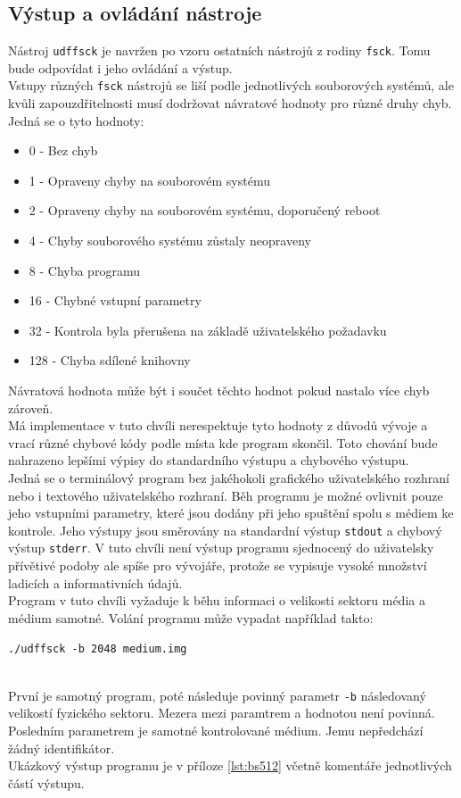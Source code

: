 \subsection{Výstup a ovládání nástroje}
Nástroj \texttt{udffsck} je navržen po vzoru ostatních nástrojů z rodiny \texttt{fsck}. Tomu bude odpovídat i jeho ovládání a výstup.\\
Vstupy různých \texttt{fsck} nástrojů se liší podle jednotlivých souborových systémů, ale kvůli zapouzdřitelnosti musí dodržovat návratové hodnoty pro různé druhy chyb. Jedná se o tyto hodnoty:
\begin{itemize}
    \item 0 - Bez chyb 
    \item 1 - Opraveny chyby na souborovém systému
    \item 2 - Opraveny chyby na souborovém systému, doporučený reboot 
    \item 4 - Chyby souborového systému zůstaly neopraveny
    \item 8 - Chyba programu
    \item 16 - Chybné vstupní parametry
    \item 32 - Kontrola byla přerušena na základě uživatelského požadavku
    \item 128 - Chyba sdílené knihovny
\end{itemize}
Návratová hodnota může být i součet těchto hodnot pokud nastalo více chyb zároveň.\\
Má implementace v tuto chvíli nerespektuje tyto hodnoty z důvodů vývoje a vrací různé chybové kódy podle místa kde program skončil. Toto chování bude nahrazeno lepšími výpisy do standardního výstupu a chybového výstupu.\\
Jedná se o terminálový program bez jakéhokoli grafického uživatelského rozhraní nebo i textového uživatelského rozhraní. Běh programu je možné ovlivnit pouze jeho vstupními parametry, které jsou dodány při jeho spuštění spolu s médiem ke kontrole. Jeho výstupy jsou směrovány na standardní výstup \texttt{stdout} a chybový výstup \texttt{stderr}. V tuto chvíli není výstup programu sjednocený do uživatelsky přívětivé podoby ale spíše pro vývojáře, protože se vypisuje vysoké množství ladicích a informativních údajů.\\
Program v tuto chvíli vyžaduje k běhu informaci o velikosti sektoru média a médium samotné. Volání programu může vypadat například takto:\\ 
\centerline{\texttt{./udffsck -b 2048 medium.img}}\\
První je samotný program, poté následuje povinný parametr \texttt{-b} následovaný velikostí fyzického sektoru. Mezera mezi paramtrem a hodnotou není povinná. Posledním parametrem je samotné kontrolované médium. Jemu nepředchází žádný identifikátor.\\
Ukázkový výstup programu je v příloze \ref{lst:bs512} včetně komentáře jednotlivých částí výstupu. 

